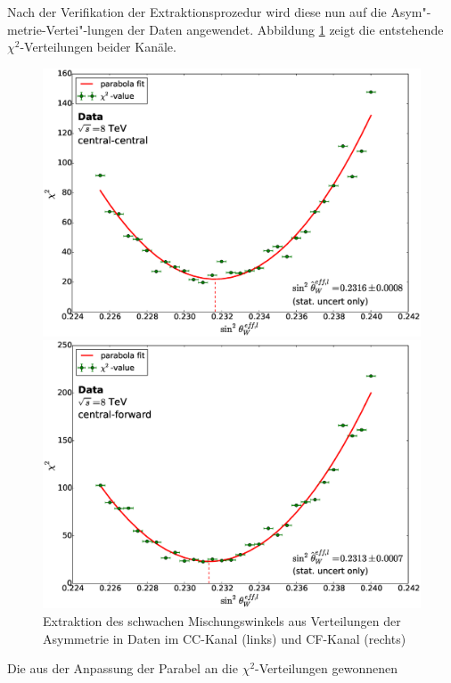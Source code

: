 Nach der Verifikation der Extraktionsprozedur wird diese nun auf die
Asym"-metrie-Vertei"-lungen der Daten angewendet. Abbildung \ref{fig:sin2theta}
zeigt die entstehende $\chi^2$-Verteilungen beider Kanäle.
\begin{figure}[p]
    \centering
    \includegraphics[width=1.0\textwidth]{plots/sin2theta_cc_data}

    \includegraphics[width=1.0\textwidth]{plots/sin2theta_cf_data}
    \caption[Extraktion des schwachen Mischungswinkels aus Verteilungen der
        Asymmetrie in Daten]
        {Extraktion des schwachen Mischungswinkels aus Verteilungen der
        Asymmetrie in Daten im \ac{CC}-Kanal (links) und \ac{CF}-Kanal
        (rechts)}
    \label{fig:sin2theta}
\end{figure}
Die aus der Anpassung der Parabel an die $\chi^2$-Verteilungen gewonnenen
